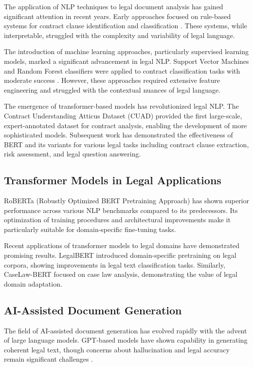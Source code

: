 \documentclass[conference]{IEEEtran}
\begin{document}
The application of NLP techniques to legal document analysis has gained significant attention in recent years. Early approaches focused on rule-based systems for contract clause identification and classification \cite{lawtech2019}. These systems, while interpretable, struggled with the complexity and variability of legal language.

The introduction of machine learning approaches, particularly supervised learning models, marked a significant advancement in legal NLP. Support Vector Machines and Random Forest classifiers were applied to contract classification tasks with moderate success \cite{legal_ml2020}. However, these approaches required extensive feature engineering and struggled with the contextual nuances of legal language.

The emergence of transformer-based models has revolutionized legal NLP. The Contract Understanding Atticus Dataset (CUAD) \cite{hendrycks2021cuad} provided the first large-scale, expert-annotated dataset for contract analysis, enabling the development of more sophisticated models. Subsequent work has demonstrated the effectiveness of BERT and its variants for various legal tasks including contract clause extraction, risk assessment, and legal question answering.

\subsection{Transformer Models in Legal Applications}

RoBERTa (Robustly Optimized BERT Pretraining Approach) \cite{liu2019roberta} has shown superior performance across various NLP benchmarks compared to its predecessors. Its optimization of training procedures and architectural improvements make it particularly suitable for domain-specific fine-tuning tasks.

Recent applications of transformer models to legal domains have demonstrated promising results. LegalBERT \cite{chalkidis2020legal} introduced domain-specific pretraining on legal corpora, showing improvements in legal text classification tasks. Similarly, CaseLaw-BERT \cite{zheng2021lawbert} focused on case law analysis, demonstrating the value of legal domain adaptation.

\subsection{AI-Assisted Document Generation}

The field of AI-assisted document generation has evolved rapidly with the advent of large language models. GPT-based models have shown capability in generating coherent legal text, though concerns about hallucination and legal accuracy remain significant challenges \cite{legal_gen2023}.
\end{document}
